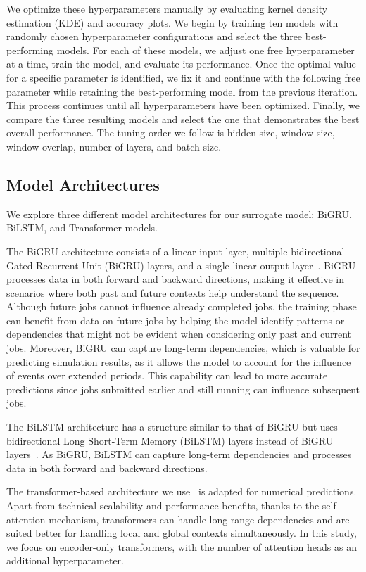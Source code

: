 We optimize these hyperparameters manually by evaluating kernel density estimation (KDE) and accuracy plots. 
%
We begin by training ten models with randomly chosen hyperparameter configurations and select the three best-performing models. 
%
For each of these models, we adjust one free hyperparameter at a time, train the model, and evaluate its performance. 
%
Once the optimal value for a specific parameter is identified, we fix it and continue with the following free parameter while retaining the best-performing model from the previous iteration. 
%
This process continues until all hyperparameters have been optimized. 
%
Finally, we compare the three resulting models and select the one that demonstrates the best overall performance. 
%
The tuning order we follow is hidden size, window size, window overlap, number of layers, and batch size.

\subsection{Model Architectures} \label{sec:approach:architectures}

We explore three different model architectures for our surrogate model: BiGRU, BiLSTM, and Transformer models.

The BiGRU architecture consists of a linear input layer, multiple bidirectional Gated Recurrent Unit (BiGRU) layers, and a single linear output layer~\cite{salehinejad_recent_2018, yuanshuai_duan_improved_2023}. 
%
BiGRU processes data in both forward and backward directions, making it effective in scenarios where both past and future contexts help understand the sequence. 
%
Although future jobs cannot influence already completed jobs, the training phase can benefit from data on future jobs by helping the model identify patterns or dependencies that might not be evident when considering only past and current jobs. 
%
Moreover, BiGRU can capture long-term dependencies, which is valuable for predicting simulation results, as it allows the model to account for the influence of events over extended periods. 
%
This capability can lead to more accurate predictions since jobs submitted earlier and still running can influence subsequent jobs.


The BiLSTM architecture has a structure similar to that of BiGRU but uses bidirectional Long Short-Term Memory (BiLSTM) layers instead of BiGRU layers~\cite{khaled_a_althelaya_evaluation_2018, salehinejad_recent_2018}. 
%
As BiGRU, BiLSTM can capture long-term dependencies and processes data in both forward and backward directions. 


The transformer-based architecture we use~\cite{wu_deep_2020} is adapted for numerical predictions. 
Apart from technical scalability and performance benefits, thanks to the self-attention mechanism, transformers can handle long-range dependencies and are suited better for handling local and global contexts simultaneously.
%
In this study, we focus on encoder-only transformers, with the number of attention heads as an additional hyperparameter. 

